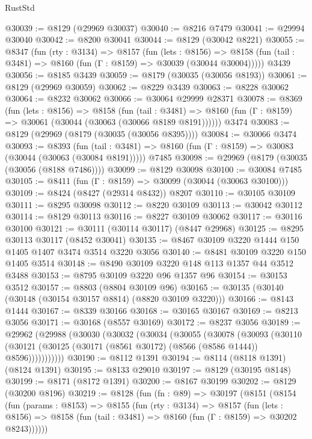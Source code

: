 \begin{lexlean}{RustStd}
\begin{coremodule}
@30039 := @8129 (@29969 @30037)
@30040 := @8216 @7479
@30041 := @29994 @30040
@30042 := @8200 @30041
@30044 := @8129 (@30042 @8221)
@30055 := @8347
    (fun (rty : @3134) =>
    @8157
      (fun (lets : @8156) =>
      @8158 (fun (tail : @3481) => @8160 (fun (Γ : @8159) => @30039 (@30044 @30004)))))
    @3439
@30056 := @8185 @3439
@30059 := @8179 (@30035 (@30056 @8193))
@30061 := @8129 (@29969 @30059)
@30062 := @8229 @3439
@30063 := @8228 @30062
@30064 := @8232 @30062
@30066 := @30064 @29999 @28371
@30078 := @8369
    (fun (lets : @8156) =>
    @8158
      (fun (tail : @3481) =>
      @8160 (fun (Γ : @8159) => @30061 (@30044 (@30063 (@30066 @8189 @8191))))))
    @3474
@30083 := @8129 (@29969 (@8179 (@30035 (@30056 @8395))))
@30084 := @30066 @3474
@30093 := @8393
    (fun (tail : @3481) => @8160 (fun (Γ : @8159) => @30083 (@30044 (@30063 (@30084 @8191)))))
    @7485
@30098 := @29969 (@8179 (@30035 (@30056 (@8188 @7486))))
@30099 := @8129 @30098
@30100 := @30084 @7485
@30105 := @8411 (fun (Γ : @8159) => @30099 (@30044 (@30063 @30100)))
@30109 := @8424 (@8427 (@29314 @8432)) @8207
@30110 := @30105 @30109
@30111 := @8295 @30098
@30112 := @8220 @30109
@30113 := @30042 @30112
@30114 := @8129 @30113
@30116 := @8227 @30109 @30062
@30117 := @30116 @30100
@30121 := @30111 (@30114 @30117) (@8447 @29968)
@30125 := @8295 @30113 @30117 (@8452 @30041)
@30135 := @8467 @30109 @3220 @1444 @150 @1405 @1407 @3474 @3514 @3220 @3056
@30140 := @8481 @30109 @3220 @150 @1405 @3514
@30148 := @8490 @30109 @3220 @148 @113 @1357 @44 @3512 @3488
@30153 := @8795 @30109 @3220 @96 @1357 @96
@30154 := @30153 @3512
@30157 := @8803 (@8804 @30109 @96)
@30165 := @30135 (@30140 (@30148 (@30154 @30157 @8814) (@8820 @30109 @3220)))
@30166 := @8143 @1444
@30167 := @8339 @30166
@30168 := @30165 @30167
@30169 := @8213 @3056
@30171 := @30168 (@8557 @30169)
@30172 := @8237 @3056
@30189 := @29962
    (@29988
      (@30030
        (@30032
          (@30034
            (@30055
              (@30078
                (@30093
                  (@30110
                    (@30121 (@30125 (@30171 (@8561 @30172) (@8566 (@8586 @1444)) @8596)))))))))))
@30190 := @8112 @1391
@30194 := @8114 (@8118 @1391) (@8124 @1391)
@30195 := @8133 @29010
@30197 := @8129 (@30195 @8148)
@30199 := @8171 (@8172 @1391)
@30200 := @8167 @30199
@30202 := @8129 (@30200 @8196)
@30219 := @8128
    (fun (fn : @89) =>
    @30197
      (@8151
        (@8154
          (fun (params : @8153) =>
          @8155
            (fun (rty : @3134) =>
            @8157
              (fun (lets : @8156) =>
              @8158 (fun (tail : @3481) => @8160 (fun (Γ : @8159) => @30202 @8243))))))

\end{coremodule}
\end{lexlean}
